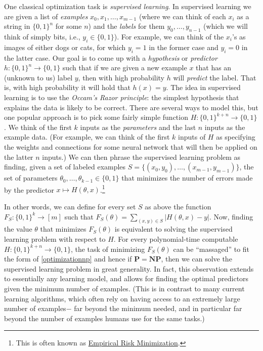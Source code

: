 One classical optimization task is \emph{supervised learning}. In
supervised learning we are given a list of \emph{examples}
\(x_0,x_1,\ldots,x_{m-1}\) (where we can think of each \(x_i\) as a
string in \(\{0,1\}^n\) for some \(n\)) and the \emph{labels} for them
\(y_0,\ldots,y_{n-1}\) (which we will think of simply bits, i.e.,
\(y_i\in \{0,1\}\)). For example, we can think of the \(x_i\)'s as
images of either dogs or cats, for which \(y_i=1\) in the former case
and \(y_i=0\) in the latter case. Our goal is to come up with a
\emph{hypothesis} or \emph{predictor}
\(h:\{0,1\}^n \rightarrow \{0,1\}\) such that if we are given a new
example \(x\) that has an (unknown to us) label \(y\), then with high
probability \(h\) will \emph{predict} the label. That is, with high
probability it will hold that \(h(x)=y\). The idea in supervised
learning is to use the \emph{Occam's Razor principle}: the simplest
hypothesis that explains the data is likely to be correct. There are
several ways to model this, but one popular approach is to pick some
fairly simple function \(H:\{0,1\}^{k+n} \rightarrow \{0,1\}\). We think
of the first \(k\) inputs as the \emph{parameters} and the last \(n\)
inputs as the example data. (For example, we can think of the first
\(k\) inputs of \(H\) as specifying the weights and connections for some
neural network that will then be applied on the latter \(n\) inputs.) We
can then phrase the supervised learning problem as finding, given a set
of labeled examples \(S=\{ (x_0,y_0),\ldots,(x_{m-1},y_{m-1}) \}\), the
set of parameters \(\theta_0,\ldots,\theta_{k-1} \in \{0,1\}\) that
minimizes the number of errors made by the predictor
\(x \mapsto H(\theta,x)\).\footnote{This is often known as
  \href{https://goo.gl/F9AgG8}{Empirical Risk Minimization}.}

In other words, we can define for every set \(S\) as above the function
\(F_S:\{0,1\}^k \rightarrow [m]\) such that
\(F_S(\theta) = \sum_{(x,y)\in S} |H(\theta,x)-y|\). Now, finding the
value \(\theta\) that minimizes \(F_S(\theta)\) is equivalent to solving
the supervised learning problem with respect to \(H\). For every
polynomial-time computable \(H:\{0,1\}^{k+n} \rightarrow \{0,1\}\), the
task of minimizing \(F_S(\theta)\) can be ``massaged'' to fit the form
of \cref{optimizationnp} and hence if \(\mathbf{P}=\mathbf{NP}\), then
we can solve the supervised learning problem in great generality. In
fact, this observation extends to essentially any learning model, and
allows for finding the optimal predictors given the minimum number of
examples. (This is in contrast to many current learning algorithms,
which often rely on having access to an extremely large number of
examples\(-\) far beyond the minimum needed, and in particular far
beyond the number of examples humans use for the same tasks.)

